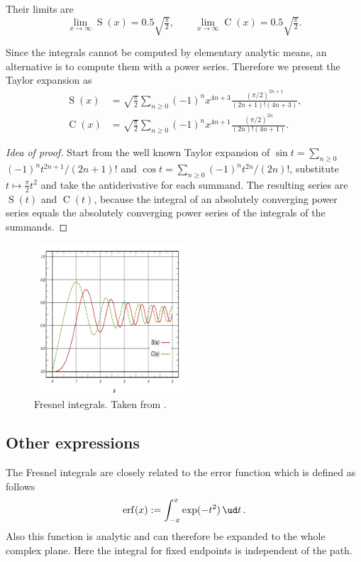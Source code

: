 \documentclass[12pt]{article}
\DeclareMathOperator\Cee{C} %
\def\d#1{{\,\ud#1\,}}
\DeclareMathOperator\erf{erf} %
\DeclareMathOperator\eS{S} %
\begin{document}
Their limits are
\[  \lim_{x\to\infty} \eS(x) = 0.5\sqrt{\tfrac\pi2},\qquad  \lim_{x\to\infty} \Cee(x) = 0.5\sqrt{\tfrac\pi2}.
\]

Since the integrals cannot be computed by elementary analytic means, an alternative is to compute them with a power series.  Therefore we present the Taylor expansion as
\begin{align*}
  \eS(x) &= \sqrt{\frac\pi2}\sum_{n\ge0} (-1)^nx^{4n+3}\frac{(\pi/2)^{2n+1}}{(2n+1)!(4n+3)}, \\
  \Cee(x) &= \sqrt{\frac\pi2}\sum_{n\ge0} (-1)^nx^{4n+1}\frac{(\pi/2)^{2n}}{(2n)!(4n+1)}.
\end{align*}
\begin{proof}[Idea of proof]  Start from the well known Taylor expansion of $\sin t = \sum_{n\ge0}$ $(-1)^n t^{2n+1}/(2n+1)!$ and $\cos t = \sum_{n\ge0} (-1)^nt^{2n}/(2n)!$, substitute $t\mapsto \tfrac\pi2 t^2$ and take the antiderivative for each summand.  The resulting series are $\eS(t)$ and $\Cee(t)$, because the integral of an absolutely converging power series equals the absolutely converging power series of the integrals of the summands.
\end{proof}

\begin{figure}[h!]
	\centering
	\includegraphics[width=0.5\textwidth]{Fresnel-Integrals-(Normalised).png}
	\caption{Fresnel integrals.  Taken from \cite[/Fresnel\_Integral]{wiki}.}
\end{figure}


\subsection{Other expressions}
The Fresnel integrals are closely related to the error function which is defined as follows
$$  \erf(x) := \int_{-x}^x \exp(-t^2) \d{t}.
$$
Also this function is analytic and can therefore be expanded to the whole complex plane.  Here the integral for fixed endpoints is independent of the path.
\end{document}
